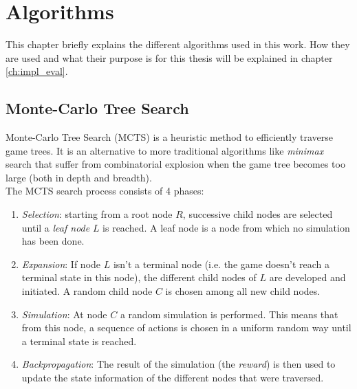 \chapter{Algorithms}

This chapter briefly explains the different algorithms used in this work. How they are used and what their purpose is for this thesis will be explained in chapter \ref{ch:impl_eval}.\\

\section{Monte-Carlo Tree Search}
\label{sec:intro_mcts}
Monte-Carlo Tree Search (MCTS) \cite{coulom2006efficient} is a heuristic method to efficiently traverse game trees. It is an alternative to more traditional algorithms like \emph{minimax}\cite{russell2016artificial} search that suffer from combinatorial explosion when the game tree becomes too large (both in depth and breadth).\\

The MCTS search process consists of 4 phases:
\begin{enumerate}
    \item \emph{Selection}: starting from a root node $R$, successive child nodes are selected until a \emph{leaf node} $L$ is reached. A leaf node is a node from which no simulation has been done. 
    \item \emph{Expansion}: If node $L$ isn't a terminal node (i.e. the game doesn't reach a terminal state in this node), the different child nodes of $L$ are developed and initiated. A random child node $C$ is chosen among all new child nodes.
    \item \emph{Simulation}: At node $C$ a random simulation is performed. This means that from this node, a sequence of actions is chosen in a uniform random way until a terminal state is reached. 
    \item \emph{Backpropagation}: The result of the simulation (the \emph{reward}) is then used to update the state information of the different nodes that were traversed.
\end{enumerate}

